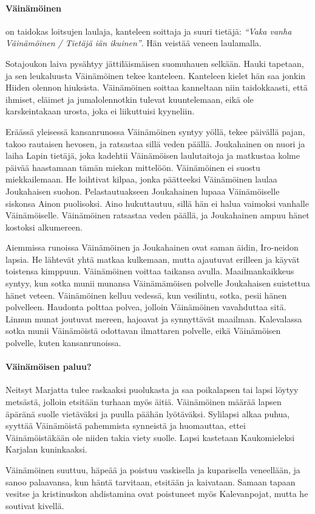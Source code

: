   \paragraph{Väinämöinen} on taidokas loitsujen laulaja, kanteleen soittaja ja suuri tietäjä:
    \emph{``Vaka vanha Väinämöinen / Tietäjä iän ikuinen''}. Hän veistää veneen laulamalla.
    \par
    Sotajoukon laiva pysähtyy jättiläismäisen suomuhauen selkään. Hauki tapetaan, ja sen
    leukaluusta Väinämöinen tekee kanteleen. Kanteleen kielet hän saa jonkin Hiiden olennon
    hiuksista. Väinämöinen soittaa kanneltaan niin taidokkaasti, että ihmiset, eläimet ja
    jumalolennotkin tulevat kuuntelemaan, eikä ole karskeintakaan urosta, joka ei liikuttuisi
    kyyneliin.
    \par
    Eräässä yleisessä kansanrunossa Väinämöinen syntyy yöllä, tekee päivällä pajan, takoo
    rautaisen hevosen, ja ratsastaa sillä veden päällä. Joukahainen on nuori ja laiha Lapin
    tietäjä, joka kadehtii Väinämöisen laulutaitoja ja matkustaa kolme päivää haastamaan tämän
    miekan mittelöön. Väinämöinen ei suostu miekkailemaan. He loihtivat kilpaa, jonka päätteeksi
    Väinämöinen laulaa Joukahaisen suohon. Pelastautuakseen Joukahainen lupaaa Väinämöiselle
    siskonsa Ainon puolisoksi. Aino hukuttautuu, sillä hän ei halua vaimoksi vanhalle
    Väinämöiselle. Väinämöinen ratsastaa veden päällä, ja Joukahainen ampuu hänet kostoksi
    alkumereen.
    \par
    Aiemmissa runoissa Väinämöinen ja Joukahainen ovat saman äidin, Iro-neidon lapsia. He lähtevät
    yhtä matkaa kulkemaan, mutta ajautuvat erilleen ja käyvät toistensa kimppuun. Väinämöinen
    voittaa taikansa avulla. Maailmankaikkeus syntyy, kun sotka munii munansa Väinämämöisen
    polvelle Joukahaisen suistettua hänet veteen. Väinämöinen kelluu vedessä, kun vesilintu, sotka,
    pesii hänen polvelleen. Haudonta polttaa polvea, jolloin Väinämöinen vavahduttaa sitä.
    Linnun munat joutuvat mereen, hajoavat ja synnyttävät maailman. Kalevalassa sotka munii
    Väinämöistä odottavan ilmattaren polvelle, eikä Väinämöisen polvelle, kuten kansanrunoissa.
  \paragraph{Väinämöisen paluu?} Neitsyt Marjatta tulee raskaaksi puolukasta ja saa poikalapsen
    tai lapsi löytyy metsästä, jolloin etsitään turhaan myös äitiä. Väinämöinen määrää lapsen
    äpäränä suolle vietäväksi ja puulla päähän lyötäväksi. Sylilapsi alkaa puhua, syyttää
    Väinämöistä pahemmista synneistä ja huomauttaa, ettei Väinämöistäkään ole niiden takia viety
    suolle. Lapsi kastetaan Kaukomieleksi Karjalan kuninkaaksi.
    \par
    Väinämöinen suuttuu, häpeää ja poistuu vaskisella ja kuparisella veneellään, ja sanoo
    palaavansa, kun häntä tarvitaan, etsitään ja kaivataan. Samaan tapaan vesitse ja kristinuskon
    ahdistamina ovat poistuneet myös Kalevanpojat, mutta he soutivat kivellä.



